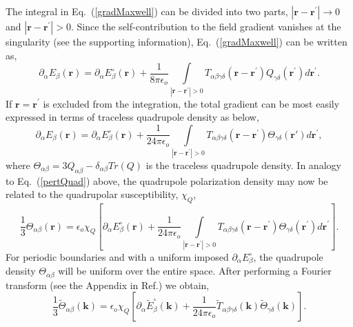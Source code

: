 The integral in Eq.~(\ref{gradMaxwell}) can be divided into two
parts, $|\mathbf{r}-\mathbf{r}^\prime|\rightarrow 0 $ and
$|\mathbf{r}-\mathbf{r}^\prime|> 0$. Since the self-contribution to
the field gradient vanishes at the singularity (see the supporting
information), Eq.~(\ref{gradMaxwell}) can be written as,
\begin{equation}
\partial_\alpha E_\beta(\mathbf{r}) = \partial_\alpha {E}^\circ_\beta(\mathbf{r}) +
  \frac{1}{8\pi \epsilon_o}\int\limits_{|\mathbf{r}-\mathbf{r}^\prime|> 0 }
  T_{\alpha\beta\gamma\delta}(\mathbf{r}-\mathbf{r}^\prime)
  {Q}_{\gamma\delta}(\mathbf{r}^\prime) d\mathbf{r}^\prime.
\end{equation}
If $\mathbf{r} = \mathbf{r}^\prime$ is excluded from the integration,
the total gradient can be most easily expressed in terms of
traceless quadrupole density as below,\cite{LoganI81}
\begin{equation}
\partial_\alpha E_\beta(\mathbf{r}) = \partial_\alpha
{E}^\circ_\beta(\mathbf{r}) + \frac{1}{24\pi
  \epsilon_o}\int\limits_{|\mathbf{r}-\mathbf{r}^\prime|> 0 }
T_{\alpha\beta\gamma\delta}(\mathbf{r}-\mathbf{r}^\prime) \Theta_{\gamma\delta}(\mathbf{r}') d\mathbf{r}^\prime,
\end{equation}
where
$\Theta_{\alpha\beta} = 3Q_{\alpha\beta} - \delta_{\alpha\beta}Tr(Q)$
is the traceless quadrupole density. In analogy to
Eq.~(\ref{pertQuad}) above, the quadrupole polarization density may
now be related to the quadrupolar susceptibility, $\chi_Q$,
\begin{equation}
\frac{1}{3}{\Theta}_{\alpha\beta}(\mathbf{r}) = \epsilon_o {\chi}_Q
\left[\partial_\alpha {E}^\circ_\beta(\mathbf{r}) + \frac{1}{24\pi
    \epsilon_o}\int\limits_{|\mathbf{r}-\mathbf{r}^\prime|> 0 }
  T_{\alpha\beta\gamma\delta}(\mathbf{r}-\mathbf{r}^\prime)
  \Theta_{\gamma\delta}(\mathbf{r}^\prime) d\mathbf{r}^\prime \right].
\end{equation}
For periodic boundaries and with a uniform imposed
$\partial_\alpha E^\circ_\beta$, the quadrupole density
${\Theta}_{\alpha\beta}$ will be uniform over the entire space. After
performing a Fourier transform (see the Appendix in
Ref.\cite{NeumannI83}) we obtain,
\begin{equation}
\frac{1}{3}\tilde{\Theta}_{\alpha\beta}(\mathbf{k})=
\epsilon_o {\chi}_Q \left[{\partial_\alpha
    \tilde{E}^\circ_\beta}(\mathbf{k})+ \frac{1}{24\pi
    \epsilon_o} \tilde{T}_{\alpha\beta\gamma\delta}(\mathbf{k})
 \tilde{\Theta}_{\gamma\delta}(\mathbf{k})\right].
\label{fourierQuad}
\end{equation} 
